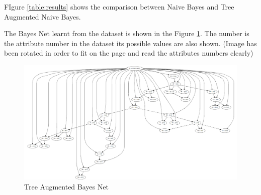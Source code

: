 FIgure \ref{table:results} shows the comparison between Naive Bayes and Tree Augmented Naive Bayes.

The Bayes Net learnt from the dataset is shown in the Figure \ref{fig:bnn}. The number is the attribute number in the dataset its possible values are also shown. (Image has been rotated in order to fit on the page and read the attributes numbers clearly)

\begin{figure}[H]
	\centering
	\includegraphics[angle=270,width=0.8\linewidth]{sections/imgs/evaluation/bn.png}
	\caption{Tree Augmented Bayes Net}
	\label{fig:bnn}
\end{figure}